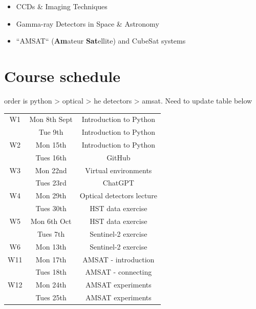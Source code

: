 \documentclass{tufte-book}
\begin{document}
\begin{itemize}
    \item CCDs \& Imaging Techniques
    \item Gamma-ray Detectors in Space \& Astronomy
    \item ``AMSAT`` (\textbf{Am}ateur \textbf{Sat}ellite) and CubeSat systems
\end{itemize}

\newpage

\section{Course schedule}

order is python > optical > he detectors > amsat. Need to update table below
\begin{table}
    \centering
    \begin{tabular}{c|c|c}
        W1 & Mon 8th Sept & Introduction to Python \\
           & Tue 9th      & Introduction to Python \\
           \hline
        W2 & Mon 15th     & Introduction to Python \\
           & Tues 16th    & GitHub\\
           \hline
        W3 & Mon 22nd     & Virtual environments\\
           & Tues 23rd    & ChatGPT\\
           \hline
        W4 & Mon 29th     & Optical detectors lecture\\
           & Tues 30th    & HST data exercise \\
           \hline
        W5 & Mon 6th Oct  & HST data exercise\\
           & Tues 7th     & Sentinel-2 exercise\\
           \hline
        W6 & Mon  13th    & Sentinel-2 exercise\\
           \hline
        W11 & Mon 17th    & AMSAT - introduction\\
           & Tues 18th    & AMSAT - connecting \\
           \hline
        W12 & Mon 24th    & AMSAT experiments\\
           & Tues 25th    & AMSAT experiments\\
        

\end{tabular}
\end{table}
\end{document}
